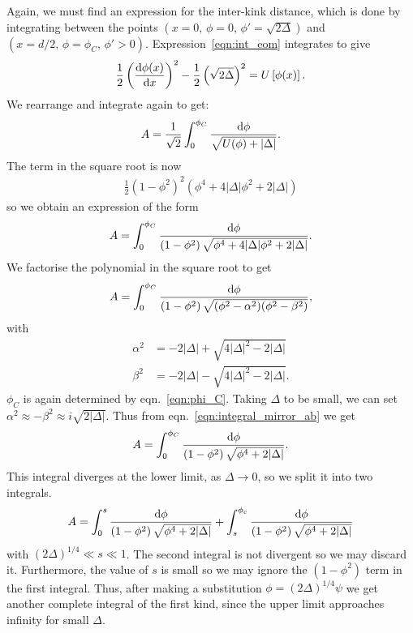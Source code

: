 \documentclass[11pt, oneside]{article}  	%
\numberwithin{equation}{section}
\newcommand{\drv}{\ensuremath{\textup{d}}}
\begin{document}
Again, we must find an expression for the inter-kink distance, which is done by integrating between the points $(x=0,\, \phi=0 ,\, \phi' = \sqrt{2\Delta})$ and $(x=d/2,\, \phi=\phi_C ,\, \phi' >0)$. Expression~\ref{eqn:int_eom} integrates to give
\begin{align}
\frac{1}{2} \left(\frac{\drv \phi(x)}{\drv x}\right)^2 - \frac{1}{2} \left(\sqrt{2\Delta} \right)^2  = U\left [ \phi(x) \right ].
\end{align}
We rearrange and integrate again to get:
\begin{align}\label{eqn:kink_mirrorkink_integral}
A = \frac{1}{\sqrt{2}} \int_{0}^{\phi_C}\frac{\drv \phi}{\sqrt{U(\phi) + |\Delta|}}.
\end{align}
The term in the square root is now
\begin{align}
    \frac{1}{2} \left (1-\phi^2 \right )^2 \left (\phi^4 + 4 |\Delta| \phi^2+2 |\Delta| \right )
\end{align}
so we obtain an expression of the form
\begin{align}
A = \int_{0}^{\phi_C}\frac{\drv \phi}{\left (1-\phi^2 \right )\sqrt{\phi^4 + 4 |\Delta| \phi^2+2 |\Delta|}}.
\end{align}
We factorise the polynomial in the square root to get 
\begin{align}\label{eqn:integral_mirror_ab}
A = \int_{0}^{\phi_C}\frac{\drv \phi}{\left (1-\phi^2 \right )\sqrt{(\phi^2 - \alpha^2)(\phi^2 - \beta^2)}},
\end{align}
with
\begin{align}
    \alpha^2 &= -2|\Delta| + \sqrt{4|\Delta|^2 - 2|\Delta |}\\
    \beta^2 &= -2|\Delta| - \sqrt{4|\Delta|^2 - 2|\Delta |}.
\end{align}
$\phi_C$ is again determined by eqn.~\ref{eqn:phi_C}. Taking $\Delta$ to be small, we can set $\alpha^2 \approx -\beta^2 \approx i \sqrt{2|\Delta|}$. Thus from eqn.~\ref{eqn:integral_mirror_ab} we get
\begin{align}
A = \int_{0}^{\phi_C}\frac{\drv \phi}{\left (1-\phi^2 \right )\sqrt{\phi^4 + 2|\Delta|}}.
\end{align}
This integral diverges at the lower limit, as $\Delta \rightarrow 0 $, so we split it into two integrals.
\begin{align}
A = \int_{0}^{s}\frac{\drv \phi}{\left (1-\phi^2 \right )\sqrt{\phi^4 + 2|\Delta|}} + \int_{s}^{\phi_c}\frac{\drv \phi}{\left (1-\phi^2 \right )\sqrt{\phi^4 + 2|\Delta|}}
\end{align}
with $(2\Delta)^{1/4} \ll s \ll 1$. The second integral is not divergent so we may discard it. Furthermore, the value of $s$ is small so we may ignore the $(1-\phi^2)$ term in the first integral. Thus, after making a substitution $\phi = (2\Delta)^{1/4}\psi$ we get another complete integral of the first kind, since the upper limit approaches infinity for small $\Delta$.
\end{document}
